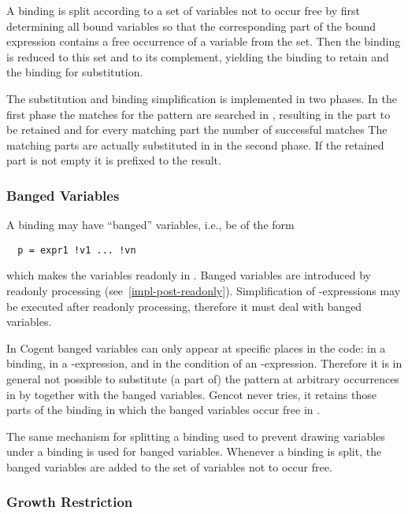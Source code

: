 A binding is split according to a set of variables not to occur free by first determining all bound variables so that the 
corresponding part of the bound expression contains a free occurrence of a variable from the set. Then the binding is reduced
to this set and to its complement, yielding the binding to retain and the binding for substitution.

The substitution and binding simplification is implemented in two phases. In the first phase the matches for the pattern are 
searched in , resulting in the part to be retained and for every matching part the number of successful matches
The matching parts are actually substituted in  in the second phase. If the retained part is not empty it is 
prefixed to the result.

\subsubsection{Banged Variables}

A binding may have ``banged'' variables, i.e., be of the form
\begin{verbatim}
  p = expr1 !v1 ... !vn
\end{verbatim}
which makes the variables  readonly in . Banged variables are introduced by readonly processing 
(see~\ref{impl-post-readonly}). Simplification of -expressions may be executed after readonly processing, therefore it
must deal with banged variables.

In Cogent banged variables can only appear at specific places in the code: in a  binding, in a -expression, 
and in the condition of an -expression. Therefore it is in general not possible to substitute (a part of) the pattern 
at arbitrary occurrences in  by  together with the banged variables. Gencot never tries, it retains those
parts of the binding in which the banged variables occur free in .

The same mechanism for splitting a binding used to prevent drawing variables under a binding is used for banged variables. Whenever
a binding is split, the banged variables are added to the set of variables not to occur free.

\subsubsection{Growth Restriction}

